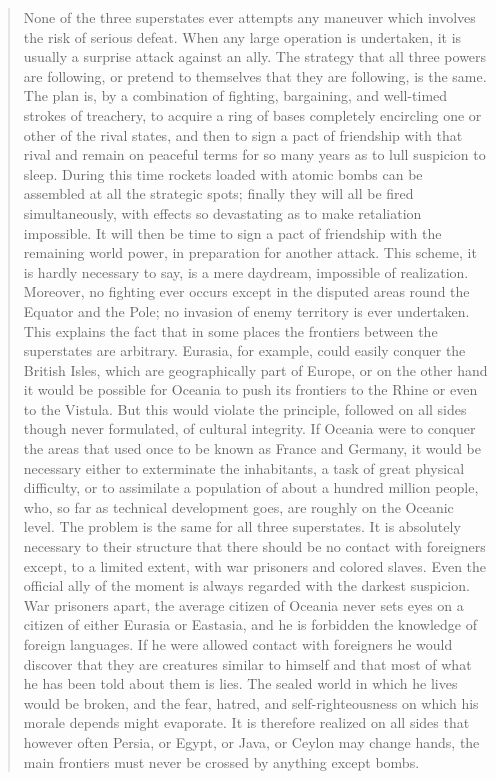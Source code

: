 \begin{paracol}{2}
\begin{quotation}
None of the three superstates ever attempts any maneuver which involves
the risk of serious defeat. When any large operation is undertaken, it
is usually a surprise attack against an ally. The strategy that all
three powers are following, or pretend to themselves that they are
following, is the same. The plan is, by a combination of fighting,
bargaining, and well-timed strokes of treachery, to acquire a ring of
bases completely encircling one or other of the rival states, and then
to sign a pact of friendship with that rival and remain on peaceful
terms for so many years as to lull suspicion to sleep. During this time
rockets loaded with atomic bombs can be assembled at all the strategic
spots; finally they will all be fired simultaneously, with effects so
devastating as to make retaliation impossible. It will then be time to
sign a pact of friendship with the remaining world power, in preparation
for another attack. This scheme, it is hardly necessary to say, is a
mere daydream, impossible of realization. Moreover, no fighting ever
occurs except in the disputed areas round the Equator and the Pole; no
invasion of enemy territory is ever undertaken. This explains the fact
that in some places the frontiers between the superstates are arbitrary.
Eurasia, for example, could easily conquer the British Isles, which are
geographically part of Europe, or on the other hand it would be possible
for Oceania to push its frontiers to the Rhine or even to the Vistula.
But this would violate the principle, followed on all sides though never
formulated, of cultural integrity. If Oceania were to conquer the areas
that used once to be known as France and Germany, it would be necessary
either to exterminate the inhabitants, a task of great physical
difficulty, or to assimilate a population of about a hundred million
people, who, so far as technical development goes, are roughly on the
Oceanic level. The problem is the same for all three superstates. It is
absolutely necessary to their structure that there should be no contact
with foreigners except, to a limited extent, with war prisoners and
colored slaves. Even the official ally of the moment is always regarded
with the darkest suspicion. War prisoners apart, the average citizen of
Oceania never sets eyes on a citizen of either Eurasia or Eastasia, and
he is forbidden the knowledge of foreign languages. If he were allowed
contact with foreigners he would discover that they are creatures
similar to himself and that most of what he has been told about them is
lies. The sealed world in which he lives would be broken, and the fear,
hatred, and self-righteousness on which his morale depends might
evaporate. It is therefore realized on all sides that however often
Persia, or Egypt, or Java, or Ceylon may change hands, the main
frontiers must never be crossed by anything except bombs.
\end{quotation}


\end{paracol}
